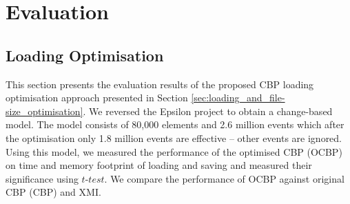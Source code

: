 \documentclass[sigplan,review,anonymous]{acmart}\settopmatter{printfolios=true,printccs=false,printacmref=false}
\begin{document}
\section{Evaluation}

%
%

\subsection{Loading Optimisation}
This section presents the evaluation results of the proposed CBP loading optimisation approach presented in Section \ref{sec:loading_and_file-size_optimisation}. We reversed the Epsilon project \cite{eclipse2017epsilon} to obtain a change-based model. The model consists of 80,000 elements and 2.6 million events which after the optimisation only 1.8 million events are effective -- other events are ignored. Using this model, we measured the performance of the optimised CBP (OCBP) on time and memory footprint of loading and saving and measured their significance using $t$-$test$. We compare the performance of OCBP against original CBP (CBP) and XMI. 
\end{document}
